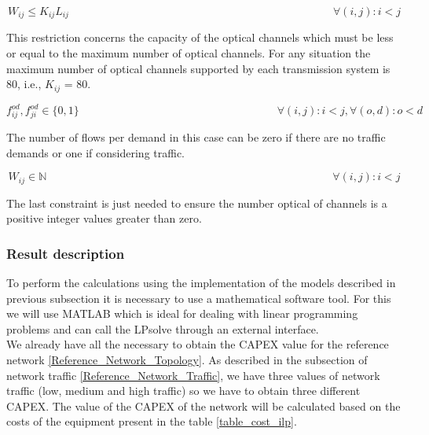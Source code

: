 \begin{equation}
W_{ij} \leq K_{ij} L_{ij} \qquad  \qquad \qquad \qquad \qquad \qquad \qquad \qquad \qquad \qquad \qquad \qquad \forall(i,j) : i < j
\label{ILPOpaque5_Surv}
\end{equation}

This restriction concerns the capacity of the optical channels which must be less or equal to the maximum number of optical channels. For any situation the maximum number of optical channels supported by each transmission system is 80, i.e., $K_{ij}$ = 80.

\begin{equation}
f_{ij}^{od} , f_{ji}^{od} \in \{0,1\}   \qquad \qquad \qquad \qquad \qquad \qquad \qquad \qquad \qquad
\forall(i,j) : i < j, \forall(o,d) : o < d
\label{ILPOpaque6_Surv}
\end{equation}

The number of flows per demand in this case can be zero if there are no traffic demands or one if considering traffic.

\begin{equation}
W_{ij} \in \mathbb{N}  \qquad \qquad \qquad \qquad \qquad \qquad \qquad \qquad \qquad \qquad \qquad \qquad \qquad
\forall(i,j) : i < j
\label{ILPOpaque7_Surv}
\end{equation}

The last constraint is just needed to ensure the number optical of channels is a positive integer values greater than zero.\\


\subsubsection{Result description}

To perform the calculations using the implementation of the models described in previous subsection it is necessary to use a mathematical software tool. For this we will use MATLAB which is ideal for dealing with linear programming problems and can call the LPsolve through an external interface.\\
We already have all the necessary to obtain the CAPEX value for the reference network \ref{Reference_Network_Topology}. As described in the subsection of network traffic \ref{Reference_Network_Traffic}, we have three values of network traffic (low, medium and high traffic) so we have to obtain three different CAPEX.
The value of the CAPEX of the network will be calculated based on the costs of the equipment present in the table \ref{table_cost_ilp}.

